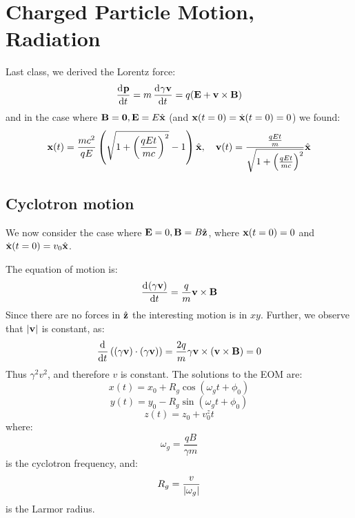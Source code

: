\section{Charged Particle Motion, Radiation}
Last class, we derived the Lorentz force:
\begin{equation}
    \dod{\v{p}}{t} = m\dod{\gamma \v{v}}{t} = q(\v{E} + \v{v} \times \v{B})
\end{equation}
and in the case where $\mathbf{B} = \mathbf{0}, \mathbf{E} = E\hat{\mathbf{x}}$ (and $\mathbf{x}(t=0) = \dot{\mathbf{x}}(t=0) = 0$) we found:
\begin{equation}
    \mathbf{x}(t) = \frac{mc^2}{qE}\left(\sqrt{1 + \left(\frac{qEt}{mc}\right)^2} - 1\right)\hat{\mathbf{x}}, \quad \mathbf{v}(t) = \frac{\frac{qEt}{m}}{\sqrt{1 + \left(\frac{qEt}{mc}\right)^2}}\hat{\mathbf{x}}
\end{equation}

\subsection{Cyclotron motion}
We now consider the case where $\mathbf{E} = 0, \mathbf{B} = B\hat{\mathbf{z}}$, where $\mathbf{x}(t=0) =0$ and $\dot{\mathbf{x}}(t=0) = v_0\hat{\mathbf{x}}$.

The equation of motion is:
\begin{equation}
    \dod{(\gamma \v{v})}{t} = \frac{q}{m}\v{v}\times\v{B}
\end{equation}
Since there are no forces in $\hat{\mathbf{z}}$ the interesting motion is in $xy$. Further, we observe that $\lvert \mathbf{v} \rvert$ is constant, as:
\begin{equation}
    \dod{}{t}((\gamma \v{v}) \cdot (\gamma \v{v})) = \frac{2q}{m}\gamma \v{v} \times (\v{v} \times \v{B}) = 0
\end{equation}
Thus $\gamma^2 v^2$, and therefore $v$ is constant. The solutions to the EOM are:
\begin{equation}
    x(t) = x_0 + R_g\cos(\omega_g t + \phi_0)
\end{equation}
\begin{equation}
    y(t) = y_0 - R_g\sin(\omega_g t + \phi_0)
\end{equation}
\begin{equation}
    z(t) = z_0 + v_0^z t
\end{equation}
where:
\begin{equation}
    \omega_g = \frac{qB}{\gamma m}
\end{equation}
is the cyclotron frequency, and:
\begin{equation}
    R_g = \frac{v}{\lvert \omega_g \rvert}
\end{equation}
is the Larmor radius.

